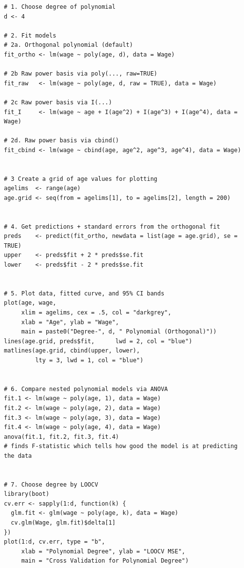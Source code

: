 \documentclass{article}
\begin{document}
\begin{lstlisting}
# 1. Choose degree of polynomial
d <- 4

# 2. Fit models
# 2a. Orthogonal polynomial (default)
fit_ortho <- lm(wage ~ poly(age, d), data = Wage)

# 2b Raw power basis via poly(..., raw=TRUE)
fit_raw   <- lm(wage ~ poly(age, d, raw = TRUE), data = Wage)

# 2c Raw power basis via I(...)
fit_I     <- lm(wage ~ age + I(age^2) + I(age^3) + I(age^4), data = Wage)

# 2d. Raw power basis via cbind()
fit_cbind <- lm(wage ~ cbind(age, age^2, age^3, age^4), data = Wage)


# 3 Create a grid of age values for plotting
agelims  <- range(age)
age.grid <- seq(from = agelims[1], to = agelims[2], length = 200)


# 4. Get predictions + standard errors from the orthogonal fit
preds    <- predict(fit_ortho, newdata = list(age = age.grid), se = TRUE)
upper    <- preds$fit + 2 * preds$se.fit
lower    <- preds$fit - 2 * preds$se.fit


# 5. Plot data, fitted curve, and 95% CI bands
plot(age, wage,
     xlim = agelims, cex = .5, col = "darkgrey",
     xlab = "Age", ylab = "Wage",
     main = paste0("Degree-", d, " Polynomial (Orthogonal)"))
lines(age.grid, preds$fit,      lwd = 2, col = "blue")
matlines(age.grid, cbind(upper, lower),
         lty = 3, lwd = 1, col = "blue")


# 6. Compare nested polynomial models via ANOVA
fit.1 <- lm(wage ~ poly(age, 1), data = Wage)
fit.2 <- lm(wage ~ poly(age, 2), data = Wage)
fit.3 <- lm(wage ~ poly(age, 3), data = Wage)
fit.4 <- lm(wage ~ poly(age, 4), data = Wage)
anova(fit.1, fit.2, fit.3, fit.4)
# finds F-statistic which tells how good the model is at predicting the data


# 7. Choose degree by LOOCV
library(boot)
cv.err <- sapply(1:d, function(k) {
  glm.fit <- glm(wage ~ poly(age, k), data = Wage)
  cv.glm(Wage, glm.fit)$delta[1]
})
plot(1:d, cv.err, type = "b",
     xlab = "Polynomial Degree", ylab = "LOOCV MSE",
     main = "Cross Validation for Polynomial Degree")
\end{lstlisting}
\end{document}
